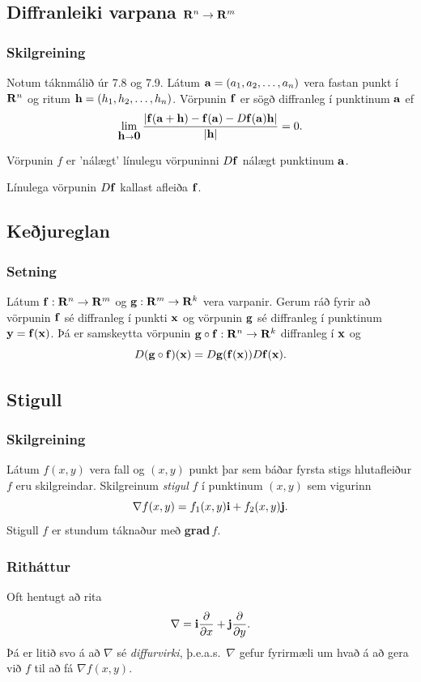 \subsection{Diffranleiki varpana $\mbox{${\bf R}^n$}\rightarrow\mbox{${\bf R}^m$}$} 
 \subsubsection{Skilgreining }
 Notum táknmálið úr 7.8 og 7.9. Látum $\mbox{${\bf a}$}=(a_1, a_2, \ldots, a_n)$ vera fastan punkt í $\mbox{${\bf R}^n$}$ og ritum 
$\mbox{${\bf h}$}=(h_1,h_2,\ldots,h_n)$.  Vörpunin $\mbox{${\bf f}$}$ er
sögð diffranleg í punktinum $\mbox{${\bf a}$}$ ef
$$\lim_{\mbox{${\bf h}$}\rightarrow
  \mbox{${\bf 0}$}}\frac{|\mbox{${\bf f}$}(\mbox{${\bf a}$}+\mbox{${\bf h}$})-\mbox{${\bf f}$}(\mbox{${\bf a}$})-D\mbox{${\bf f}$}(\mbox{${\bf a}$})\mbox{${\bf h}$}|}{|\mbox{${\bf h}$}|}=0.$$ 

\bigskip
Vörpunin $f$ er 'nálægt' línulegu vörpuninni $D\mbox{${\bf f}$}$ nálægt punktinum $\mbox{${\bf a}$}$.

\bigskip
Línulega vörpunin $D\mbox{${\bf f}$}$ kallast afleiða $\mbox{${\bf f}$}$.



\subsection{Keðjureglan} 
 \subsubsection{Setning }
Látum $\mbox{${\bf f}$}:\mbox{${\bf R}^n$}\rightarrow \mbox{${\bf R}^m$}$ og 
$\mbox{${\bf g}$}:\mbox{${\bf R}^m$}\rightarrow \mbox{${\bf R}^k$}$ vera varpanir.  Gerum ráð fyrir að vörpunin
$\mbox{${\bf f}$}$ sé diffranleg í punkti $\mbox{${\bf x}$}$ og vörpunin $\mbox{${\bf g}$}$ sé diffranleg í
punktinum $\mbox{${\bf y}$}=\mbox{${\bf f}$}(\mbox{${\bf x}$})$.  Þá er samskeytta vörpunin
$\mbox{${\bf g}$}\circ\mbox{${\bf f}$}:\mbox{${\bf R}^n$}\rightarrow\mbox{${\bf R}^k$}$ diffranleg í $\mbox{${\bf x}$}$ og 
$$D(\mbox{${\bf g}$}\circ\mbox{${\bf f}$})(\mbox{${\bf x}$})=D\mbox{${\bf g}$}(\mbox{${\bf f}$}(\mbox{${\bf x}$}))D\mbox{${\bf f}$}(\mbox{${\bf x}$}).$$



\subsection{Stigull} 

\subsubsection{Skilgreining }

 Látum $f(x,y)$ vera fall og $(x,y)$ punkt þar
sem báðar fyrsta stigs hlutafleiður $f$ eru skilgreindar.  Skilgreinum
{\em stigul} $f$ í punktinum $(x,y)$ sem vigurinn 
$$\nabla f(x,y)=f_1(x,y)\mbox{${\bf i}$}+f_2(x,y)\mbox{${\bf j}$}.$$
Stigull $f$ er stundum táknaður með {\bf grad}$\,f$.



\subsubsection{Ritháttur }
Oft hentugt að rita
$$\nabla=\mbox{${\bf i}$}\frac{\partial}{\partial x}+ \mbox{${\bf j}$}\frac{\partial}{\partial y}.$$
Þá er litið svo á að $\nabla$ sé {\em diffurvirki}, þ.e.a.s.\ $\nabla$
gefur fyrirmæli um hvað á að gera við $f$ til að fá $\nabla f(x,y)$.




